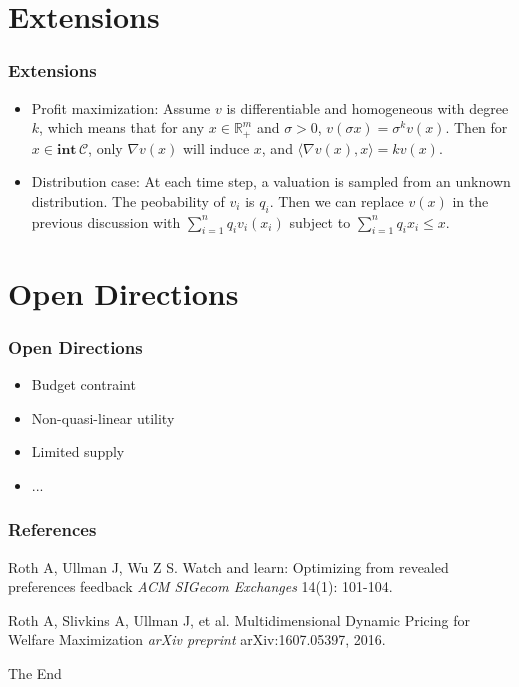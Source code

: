 \documentclass{beamer}
\begin{document}
\section{Extensions}
\begin{frame}
    \frametitle{Extensions}
    \begin{itemize}
        \item Profit maximization: Assume $v$ is differentiable and homogeneous with degree $k$, which means that for any $x\in \mathbb{R}_+^m$ and $\sigma>0$, $v(\sigma x)=\sigma^k v(x)$. Then for $x\in \mathbf{int}\,\mathcal{C}$, only $\nabla v(x)$ will induce $x$, and $\langle\nabla v(x),x\rangle=kv(x)$.

        \item Distribution case: At each time step, a valuation is sampled from an unknown distribution. The peobability of $v_i$ is $q_i$. Then we can replace $v(x)$ in the previous discussion with $\sum_{i=1}^{n}q_iv_i(x_i)$ subject to $\sum_{i=1}^{n}q_ix_i\le x$.
    \end{itemize}
\end{frame}

\section{Open Directions}
\begin{frame}
    \frametitle{Open Directions}
    \begin{itemize}
        \item Budget contraint
        \item Non-quasi-linear utility
        \item Limited supply
        \item ...
    \end{itemize}
\end{frame}

\begin{frame}
\frametitle{References}
\footnotesize{
\begin{thebibliography}{99} %
 Roth A, Ullman J, Wu Z S.
\newblock Watch and learn: Optimizing from revealed preferences feedback
\newblock \emph{ACM SIGecom Exchanges} 14(1): 101-104.

 Roth A, Slivkins A, Ullman J, et al.
\newblock Multidimensional Dynamic Pricing for Welfare Maximization
\newblock \emph{arXiv preprint} arXiv:1607.05397, 2016.
\end{thebibliography}
}
\end{frame}


\begin{frame}
\Huge{\centerline{The End}}
\end{frame}

\end{document}

